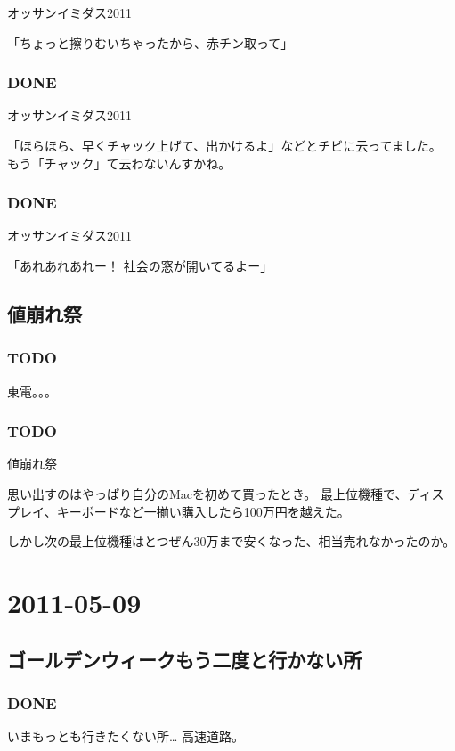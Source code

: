 \documentclass[11pt]{article}
\begin{document}
オッサンイミダス2011

「ちょっと擦りむいちゃったから、赤チン取って」
\subsubsection{\textbf{DONE}}
\label{sec-125_1_11}

オッサンイミダス2011

「ほらほら、早くチャック上げて、出かけるよ」などとチビに云ってました。
もう「チャック」て云わないんすかね。
\subsubsection{\textbf{DONE}}
\label{sec-125_1_12}

オッサンイミダス2011

「あれあれあれー！ 社会の窓が開いてるよー」
\subsection{値崩れ祭}
\label{sec-125_2}
\subsubsection{\textbf{TODO}}
\label{sec-125_2_1}

東電。。。
\subsubsection{\textbf{TODO}}
\label{sec-125_2_2}

値崩れ祭

思い出すのはやっぱり自分のMacを初めて買ったとき。
最上位機種で、ディスプレイ、キーボードなど一揃い購入したら100万円を越えた。

しかし次の最上位機種はとつぜん30万まで安くなった、相当売れなかったのか。
\section{2011-05-09}
\label{sec-126}
\subsection{ゴールデンウィークもう二度と行かない所}
\label{sec-126_1}
\subsubsection{\textbf{DONE}}
\label{sec-126_1_1}

いまもっとも行きたくない所… 高速道路。
\end{document}

